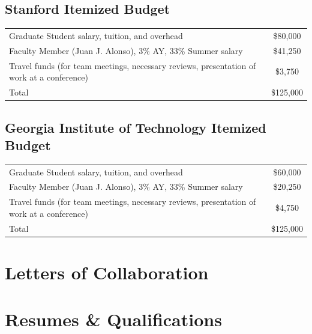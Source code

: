\documentclass[]{aiaa-tc}
\begin{document}
  \subsection{Stanford Itemized Budget}
    \begin{table}\begin{tabular}{l c}
    Graduate Student salary, tuition, and overhead &  \$80,000 \\
    Faculty Member (Juan J. Alonso), 3\% AY, 33\% Summer salary & \$41,250 \\
    Travel funds (for team meetings, necessary reviews, presentation of work at a conference) & \$3,750 \\
    \hline
    Total & \$125,000 \\ 
    \hline
    \end{tabular}\end{table}
  \subsection{Georgia Institute of Technology Itemized Budget}

    \begin{table}\begin{tabular}{l c}
    Graduate Student salary, tuition, and overhead &  \$60,000 \\
    Faculty Member (Juan J. Alonso), 3\% AY, 33\% Summer salary & \$20,250 \\
    Travel funds (for team meetings, necessary reviews, presentation of work at a conference) & \$4,750 \\
    \hline
    Total & \$125,000 \\ 
    \hline
    \end{tabular}\end{table}

  \clearpage

  \section{Letters of Collaboration}

    
    
    
    \restoregeometry


  \section{Resumes \& Qualifications}
\end{document}
